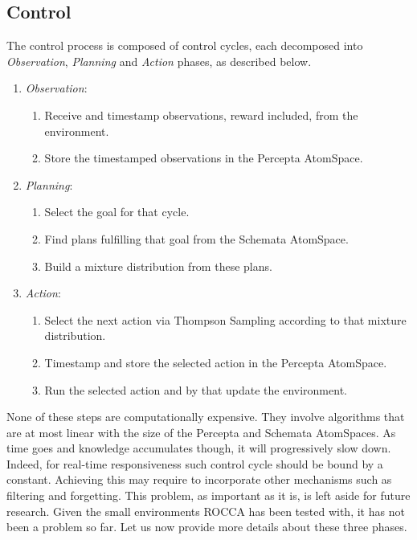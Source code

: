 \documentclass[runningheads]{llncs}
\begin{document}
\subsection{Control}
The control process is composed of control cycles, each decomposed
into \emph{Observation}, \emph{Planning} and \emph{Action} phases, as
described below.
\begin{enumerate}
\item \emph{Observation}:
  \begin{enumerate}
  \item Receive and timestamp observations, reward included, from the
    environment.
  \item Store the timestamped observations in the Percepta AtomSpace.
  \end{enumerate}
\item \emph{Planning}:
  \begin{enumerate}
  \item Select the goal for that cycle.
  \item Find plans fulfilling that goal from the Schemata AtomSpace.
  \item Build a mixture distribution from these plans.
  \end{enumerate}
\item \emph{Action}:
  \begin{enumerate}
  \item Select the next action via Thompson Sampling according to that
    mixture distribution.
  \item Timestamp and store the selected action in the Percepta
    AtomSpace.
  \item Run the selected action and by that update the environment.
  \end{enumerate}
\end{enumerate}
None of these steps are computationally expensive.  They involve
algorithms that are at most linear with the size of the Percepta and
Schemata AtomSpaces.  As time goes and knowledge accumulates though,
it will progressively slow down.  Indeed, for real-time responsiveness
such control cycle should be bound by a constant.  Achieving this may
require to incorporate other mechanisms such as filtering and
forgetting.  This problem, as important as it is, is left aside for
future research. %
Given the small environments ROCCA has
been tested with, it has not been a problem so far.
Let us now provide more details about these three phases.
\end{document}
